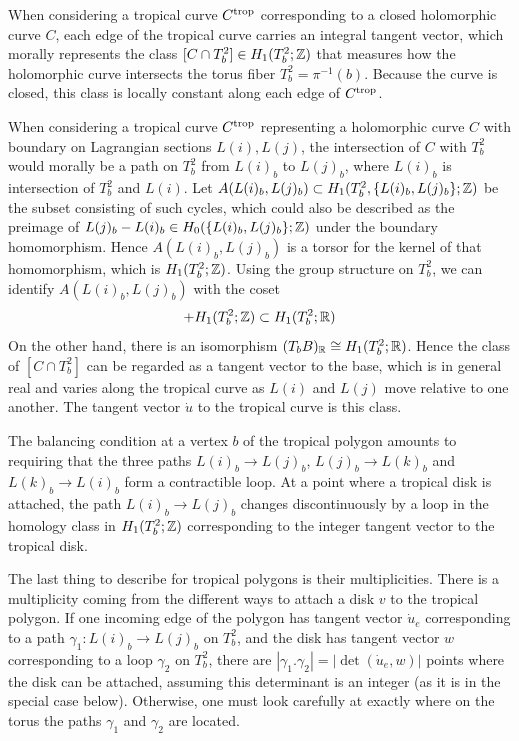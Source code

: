 \documentclass[12pt]{amsart}
\begin{document}
When considering a tropical curve $C^{\mathrm{trop}}$ corresponding to a closed
holomorphic curve $C$, each edge of the tropical curve carries an
integral tangent vector, which morally represents the class $[C\cap
T^2_b] \in H_1(T^2_b;\mathbb{Z})$ that measures how the
holomorphic curve intersects the torus fiber $T^2_b = \pi^{-1}(b)$. Because the curve is closed, this class is locally constant along
each edge of $C^{\mathrm{trop}}$.

When considering a tropical curve $C^{\mathrm{trop}}$ representing a holomorphic
curve $C$ with boundary on Lagrangian sections $L(i),L(j)$, the
intersection of $C$ with $T^2_b$ would morally be a path on $T^2_b$
from $L(i)_b$ to $L(j)_b$, where $L(i)_b$ is intersection of $T^2_b$
and $L(i)$. Let $A(L(i)_b,L(j)_b) \subset
H_1(T^2_b,\{L(i)_b,L(j)_b\};\mathbb{Z})$ be the subset consisting of such
cycles, which could also be described as the preimage of $L(j)_b -
L(i)_b \in H_0(\{L(i)_b,L(j)_b\};\mathbb{Z})$ under the boundary
homomorphism. Hence $A(L(i)_b,L(j)_b)$ is a torsor for the kernel of
that homomorphism, which is $H_1(T^2_b;\mathbb{Z})$. Using the group structure
on $T^2_b$, we can identify $A(L(i)_b,L(j)_b)$ with the coset
\begin{equation}
  [L(j)_b-L(i)_b] + H_1(T^2_b;\Z) \subset H_1(T^2_b;\R)
\end{equation}
On the other hand, there is an isomorphism $(T_bB)_\mathbb{R} \cong
H_1(T^2_b;\mathbb{R})$. Hence the class of $[C\cap T^2_b]$ can be regarded as
a tangent vector to the base, which is in general real and varies
along the tropical curve as $L(i)$ and $L(j)$ move relative to one
another. The tangent vector $\dot{u}$ to the tropical curve is
this class.


The balancing condition at a vertex $b$ of the tropical polygon
amounts to requiring that the three paths $L(i)_b\to L(j)_b$, $L(j)_b
\to L(k)_b$ and $L(k)_b\to L(i)_b$ form a contractible loop. At a
point where a tropical disk is attached, the path $L(i)_b \to L(j)_b$
changes discontinuously by a loop in the homology class in
$H_1(T^2_b;\mathbb{Z})$ corresponding to the integer tangent vector to the
tropical disk. 

The last thing to describe for tropical polygons is their
multiplicities. There is a multiplicity coming from the different ways to attach
a disk $v$ to the tropical polygon. If one incoming edge of the
polygon has tangent vector $\dot{u}_e$ corresponding to a path
$\gamma_1: L(i)_b \to L(j)_b$ on $T^2_b$, and the disk has tangent
vector $w$ corresponding to a loop $\gamma_2$ on $T^2_b$, there are
$|\gamma_1.\gamma_2| = |\det(\dot{u}_e, w)|$ points where the disk can
be attached, assuming this determinant is an integer (as it is in the
special case below). Otherwise, one must look carefully at exactly
where on the torus the paths $\gamma_1$ and $\gamma_2$ are located.
\end{document}
